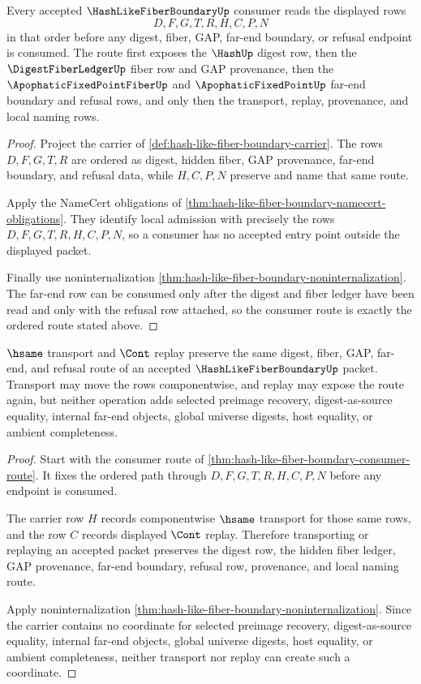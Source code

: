 \begin{theorem}
\label{thm:hash-like-fiber-boundary-consumer-route}
Every accepted $\HashLikeFiberBoundaryUp$ consumer reads the displayed rows
$$
D,F,G,T,R,H,C,P,N
$$
in that order before any digest, fiber, GAP, far-end boundary, or refusal endpoint is consumed. The route first exposes the $\HashUp$ digest row, then the $\DigestFiberLedgerUp$ fiber row and GAP provenance, then the $\ApophaticFixedPointFiberUp$ and $\ApophaticFixedPointUp$ far-end boundary and refusal rows, and only then the transport, replay, provenance, and local naming rows.
\end{theorem}
\begin{proof}
Project the carrier of \autoref{def:hash-like-fiber-boundary-carrier}. The rows $D,F,G,T,R$ are ordered as digest, hidden fiber, GAP provenance, far-end boundary, and refusal data, while $H,C,P,N$ preserve and name that same route.

Apply the NameCert obligations of \autoref{thm:hash-like-fiber-boundary-namecert-obligations}. They identify local admission with precisely the rows $D,F,G,T,R,H,C,P,N$, so a consumer has no accepted entry point outside the displayed packet.

Finally use noninternalization \autoref{thm:hash-like-fiber-boundary-noninternalization}. The far-end row can be consumed only after the digest and fiber ledger have been read and only with the refusal row attached, so the consumer route is exactly the ordered route stated above.
\end{proof}

\begin{theorem}
\label{thm:hash-like-fiber-boundary-transport-stability}
$\hsame$ transport and $\Cont$ replay preserve the same digest, fiber, GAP, far-end, and refusal route of an accepted $\HashLikeFiberBoundaryUp$ packet. Transport may move the rows componentwise, and replay may expose the route again, but neither operation adds selected preimage recovery, digest-as-source equality, internal far-end objects, global universe digests, host equality, or ambient completeness.
\end{theorem}
\begin{proof}
Start with the consumer route of \autoref{thm:hash-like-fiber-boundary-consumer-route}. It fixes the ordered path through $D,F,G,T,R,H,C,P,N$ before any endpoint is consumed.

The carrier row $H$ records componentwise $\hsame$ transport for those same rows, and the row $C$ records displayed $\Cont$ replay. Therefore transporting or replaying an accepted packet preserves the digest row, the hidden fiber ledger, GAP provenance, far-end boundary, refusal row, provenance, and local naming route.

Apply noninternalization \autoref{thm:hash-like-fiber-boundary-noninternalization}. Since the carrier contains no coordinate for selected preimage recovery, digest-as-source equality, internal far-end objects, global universe digests, host equality, or ambient completeness, neither transport nor replay can create such a coordinate.
\end{proof}

